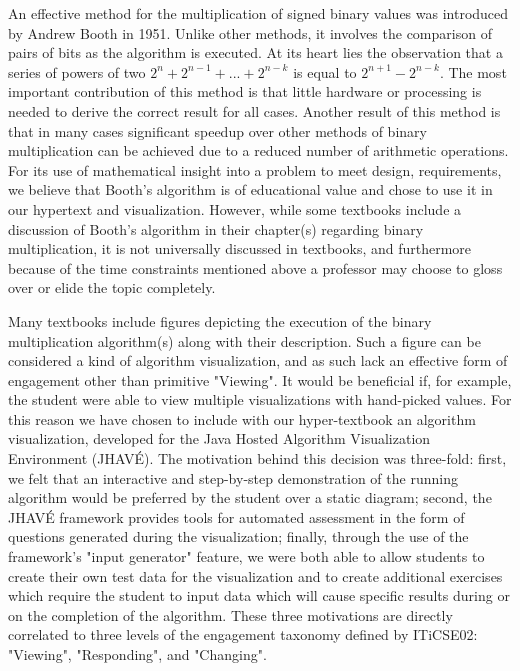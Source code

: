 \documentclass{acm_proc_article-sp}
\begin{document}
An effective method for the multiplication of signed binary values was introduced by Andrew Booth in 1951.
Unlike other methods, it involves the comparison of pairs of bits as the algorithm is executed.
At its heart lies the observation that a series of powers of two $2^n + 2^{n-1} + ...
+ 2^{n-k}$ is equal to $2^{n+1} - 2^{n-k}$.
The most important contribution of this method is that little hardware or processing is needed to derive the correct result for all cases\cite{booth}.
Another result of this method is that in many cases significant speedup over other methods of binary multiplication can be achieved due to a reduced number of arithmetic operations.\cite{needsCitation}
For its use of mathematical insight into a problem to meet design, requirements, we believe that Booth's algorithm is of educational value and chose to use it in our hypertext and visualization.
However, while some textbooks include a discussion of Booth's algorithm in their chapter(s) regarding binary multiplication, it is not universally discussed in textbooks, and furthermore because of the time constraints mentioned above a professor may choose to gloss over or elide the topic completely.

Many textbooks include figures depicting the execution of the binary multiplication algorithm(s) along with their description.
Such a figure can be considered a kind of algorithm visualization, and as such lack an effective form of engagement other than primitive "Viewing".
It would be beneficial if, for example, the student were able to view multiple visualizations with hand-picked values.
For this reason we have chosen to include with our hyper-textbook an algorithm visualization, developed for the Java Hosted Algorithm Visualization Environment (JHAVÉ)\cite{JHAVE}.
The motivation behind this decision was three-fold: first, we felt that an interactive and step-by-step demonstration of the running algorithm would be preferred by the student over a static diagram; second, the JHAVÉ framework provides tools for automated assessment in the form of questions generated during the visualization; finally, through the use of the framework's "input generator" feature, we were both able to allow students to create their own test data for the visualization and to create additional exercises which require the student to input data which will cause specific results during or on the completion of the algorithm.
These three motivations are directly correlated to three levels of the engagement taxonomy defined by ITiCSE02: "Viewing", "Responding", and "Changing".
\end{document}
